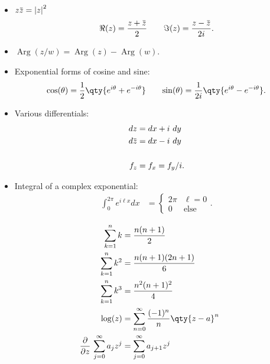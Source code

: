 \begin{fact}

\envlist

\begin{itemize}
\item
  \(z\mkern 1.5mu\overline{\mkern-1.5muz\mkern-1.5mu}\mkern 1.5mu = {\left\lvert {z} \right\rvert}^2\)
  \begin{align*}
  \Re(z) = { z + \mkern 1.5mu\overline{\mkern-1.5muz\mkern-1.5mu}\mkern 1.5mu \over 2} && && 
  \Im(z) = {z - \mkern 1.5mu\overline{\mkern-1.5muz\mkern-1.5mu}\mkern 1.5mu \over 2i}
  .\end{align*}
\item
  \(\operatorname{Arg}(z/w) = \operatorname{Arg}(z) - \operatorname{Arg}(w)\).
\item
  Exponential forms of cosine and sine:
  \begin{align*}
  \cos(\theta) = \frac 1 2 \qty{e^{i\theta} + e^{-i\theta}} && &&
  \sin(\theta) = \frac{1}{2i}\qty{e^{i\theta} - e^{-i\theta}}
  .\end{align*}
\item
  Various differentials:
  \begin{align*}
  dz &= dx + i~dy \\
  d\mkern 1.5mu\overline{\mkern-1.5muz\mkern-1.5mu}\mkern 1.5mu &= dx - i~dy \\ \\
  f_z &= f_x = f_y / i
  .\end{align*}
\item
  Integral of a complex exponential:
  \begin{align*}
  \int_{0}^{2 \pi} e^{i \ell x} d x
  &=\left\{\begin{array}{ll}
  {2 \pi} & {\ell=0} \\ 
  {0} & \text{else}
  \end{array}\right.
  .\end{align*}
\end{itemize}

\end{fact}

\begin{fact}

\begin{align*}
\sum_{k=1}^{n} k &=\frac{n(n+1)}{2} \\
\sum_{k=1}^{n} k^{2} &=\frac{n(n+1)(2 n+1)}{6} \\
\sum_{k=1}^{n} k^{3} &=\frac{n^{2}(n+1)^{2}}{4}  \\
\log(z) &= \sum_{n=0}^\infty { (-1)^n \over n} \qty{z-a}^n \\
{\frac{\partial }{\partial z}\,} \sum_{j=0}^\infty a_j z^j &= \sum_{j=0}^\infty a_{j+1}z^j
\end{align*}

\end{fact}

